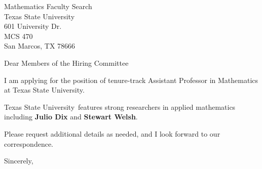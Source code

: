 




	
	
	\def\School{Texas State University}
	
	\begin{letter}
		{Mathematics Faculty Search\\
			Texas State University\\
			601 University Dr.\\
			MCS 470\\
			San Marcos, TX 78666
			
		}
		
		\opening{Dear Members of the Hiring Committee}
		
		
		I am applying for the position of tenure-track Assistant Professor in Mathematics at \School. 
		
		\School~features strong researchers in applied mathematics including \textbf{Julio Dix} and \textbf{Stewart Welsh}.  
		
		
		
		
		
		Please request additional details as needed, and I look forward to our correspondence.
		
		\closing{Sincerely,}
	\end{letter}
